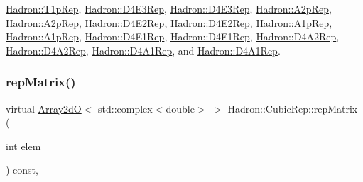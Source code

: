 \mbox{\hyperlink{structHadron_1_1T1pRep_ad5fd4bf6eaa8fd1a465bd6757d7b4379}{Hadron\+::\+T1p\+Rep}}, \mbox{\hyperlink{structHadron_1_1D4E3Rep_afd42741649d0a7906d6232710f1522aa}{Hadron\+::\+D4\+E3\+Rep}}, \mbox{\hyperlink{structHadron_1_1D4E3Rep_afd42741649d0a7906d6232710f1522aa}{Hadron\+::\+D4\+E3\+Rep}}, \mbox{\hyperlink{structHadron_1_1A2pRep_a7e7d7668295318bf08c6ab79ce2208e6}{Hadron\+::\+A2p\+Rep}}, \mbox{\hyperlink{structHadron_1_1A2pRep_a7e7d7668295318bf08c6ab79ce2208e6}{Hadron\+::\+A2p\+Rep}}, \mbox{\hyperlink{structHadron_1_1D4E2Rep_a5f1abc30578bd5d20e32ca5676a86c84}{Hadron\+::\+D4\+E2\+Rep}}, \mbox{\hyperlink{structHadron_1_1D4E2Rep_a5f1abc30578bd5d20e32ca5676a86c84}{Hadron\+::\+D4\+E2\+Rep}}, \mbox{\hyperlink{structHadron_1_1A1pRep_a9f59a2c62dd82462ab66f5a990939898}{Hadron\+::\+A1p\+Rep}}, \mbox{\hyperlink{structHadron_1_1A1pRep_a9f59a2c62dd82462ab66f5a990939898}{Hadron\+::\+A1p\+Rep}}, \mbox{\hyperlink{structHadron_1_1D4E1Rep_a5c4eb87d8e59c8653c6d4da163c300ea}{Hadron\+::\+D4\+E1\+Rep}}, \mbox{\hyperlink{structHadron_1_1D4E1Rep_a5c4eb87d8e59c8653c6d4da163c300ea}{Hadron\+::\+D4\+E1\+Rep}}, \mbox{\hyperlink{structHadron_1_1D4A2Rep_ac408f55785ba08ce215277bb1cb4a006}{Hadron\+::\+D4\+A2\+Rep}}, \mbox{\hyperlink{structHadron_1_1D4A2Rep_ac408f55785ba08ce215277bb1cb4a006}{Hadron\+::\+D4\+A2\+Rep}}, \mbox{\hyperlink{structHadron_1_1D4A1Rep_a45938f0cd557c639eedba39b63fabe29}{Hadron\+::\+D4\+A1\+Rep}}, and \mbox{\hyperlink{structHadron_1_1D4A1Rep_a45938f0cd557c639eedba39b63fabe29}{Hadron\+::\+D4\+A1\+Rep}}.

\mbox{\label{structHadron_1_1CubicRep_ac5d7e9e6f4ab1158b5fce3e4ad9e8005}} 
\subsubsection{\texorpdfstring{repMatrix()}{repMatrix()}\hspace{0.1cm}{\footnotesize\ttfamily [1/2]}}
{\footnotesize\ttfamily virtual \mbox{\hyperlink{classADAT_1_1Array2dO}{Array2dO}}$<$ std\+::complex$<$double$>$ $>$ Hadron\+::\+Cubic\+Rep\+::rep\+Matrix (\begin{DoxyParamCaption}\item[{int}]{elem }\end{DoxyParamCaption}) const\hspace{0.3cm}{\ttfamily [inline]}, {\ttfamily [virtual]}}



